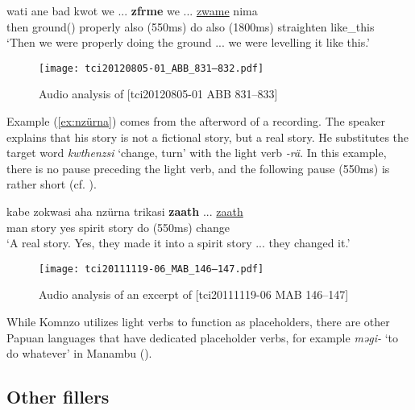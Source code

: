 \documentclass[output=paper,colorlinks,citecolor=brown]{langscibook}
\begin{document}
\ea \label{ex:bad}
    \gll wati ane bad kwot we ... \textbf{zfrme} we ... \uline{zwame} nima\\
    then  ground() properly also (550ms) do also (1800ms) straighten  like\_this\\
    \glt `Then we were properly doing the ground ... we were levelling it like this.' 
\z

\begin{figure}
    \texttt{[image: tci20120805-01\_ABB\_831–832.pdf]}
    \caption{Audio analysis of [tci20120805-01 ABB 831--833]}
    \label{fig:doehler:bad}
\end{figure}

Example (\ref{ex:nzürna}) comes from the afterword of a recording. The speaker explains that his story is not a fictional story, but a real story. He substitutes the target word \textit{kwthenzsi} `change, turn' with the light verb \textit{-rä}. In this example, there is no pause preceding the light verb, and the following pause (550ms) is rather short (cf. ).

\ea \label{ex:nzürna}
    \gll kabe zokwasi aha nzürna trikasi \textbf{zaath} ... \uline{zaath}\\
    man story yes spirit story do (550ms) change\\
    \glt `A real story. Yes, they made it into a spirit story ... they changed it.' 
\z

\begin{figure}
    \texttt{[image: tci20111119-06\_MAB\_146–147.pdf]}
    \caption{Audio analysis of an excerpt of [tci20111119-06 MAB 146--147]}
    \label{fig:doehler:nzürna}
\end{figure}

While Komnzo utilizes light verbs to function as placeholders, there are other Papuan languages that have dedicated placeholder verbs, for example \textit{məgi-} `to do whatever' in Manambu (\cite[576]{Aikhenvald:2008aa}).

\subsection{Other fillers}\label{sec:doehler:stylistic}
\end{document}
